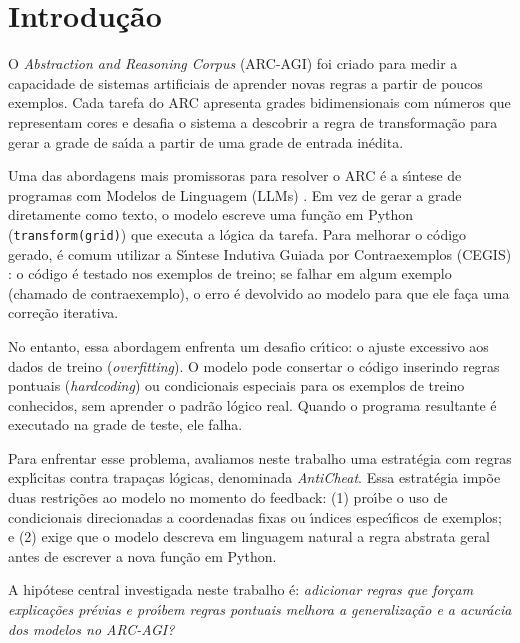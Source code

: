\section{Introdu\c{c}\~{a}o}

O \textit{Abstraction and Reasoning Corpus} (ARC-AGI) \cite{chollet2019measure} foi criado para medir a capacidade de sistemas artificiais de aprender novas regras a partir de poucos exemplos. Cada tarefa do ARC apresenta grades bidimensionais com n\'{u}meros que representam cores e desafia o sistema a descobrir a regra de transforma\c{c}\~{a}o para gerar a grade de sa\'{\i}da a partir de uma grade de entrada in\'{e}dita.

Uma das abordagens mais promissoras para resolver o ARC \'{e} a s\'{\i}ntese de programas com Modelos de Linguagem (LLMs) \cite{greenblatt2024getting}. Em vez de gerar a grade diretamente como texto, o modelo escreve uma fun\c{c}\~{a}o em Python (\texttt{transform(grid)}) que executa a l\'{o}gica da tarefa. Para melhorar o c\'{o}digo gerado, \'{e} comum utilizar a S\'{\i}ntese Indutiva Guiada por Contraexemplos (CEGIS) \cite{solar2008program}: o c\'{o}digo \'{e} testado nos exemplos de treino; se falhar em algum exemplo (chamado de contraexemplo), o erro \'{e} devolvido ao modelo para que ele fa\c{c}a uma corre\c{c}\~{a}o iterativa.

No entanto, essa abordagem enfrenta um desafio cr\'{\i}tico: o ajuste excessivo aos dados de treino (\textit{overfitting}). O modelo pode consertar o c\'{o}digo inserindo regras pontuais (\textit{hardcoding}) ou condicionais especiais para os exemplos de treino conhecidos, sem aprender o padr\~{a}o l\'{o}gico real. Quando o programa resultante \'{e} executado na grade de teste, ele falha.

Para enfrentar esse problema, avaliamos neste trabalho uma estrat\'{e}gia com regras expl\'{\i}citas contra trapa\c{c}as l\'{o}gicas, denominada \textit{AntiCheat}. Essa estrat\'{e}gia imp\~{o}e duas restri\c{c}\~{o}es ao modelo no momento do feedback: (1) pro\'{\i}be o uso de condicionais direcionadas a coordenadas fixas ou \'{\i}ndices espec\'{\i}ficos de exemplos; e (2) exige que o modelo descreva em linguagem natural a regra abstrata geral antes de escrever a nova fun\c{c}\~{a}o em Python. 

A hip\'{o}tese central investigada neste trabalho \'{e}: \textit{adicionar regras que for\c{c}am explica\c{c}\~{o}es pr\'{e}vias e pro\'{\i}bem regras pontuais melhora a generaliza\c{c}\~{a}o e a acur\'{a}cia dos modelos no ARC-AGI?}

